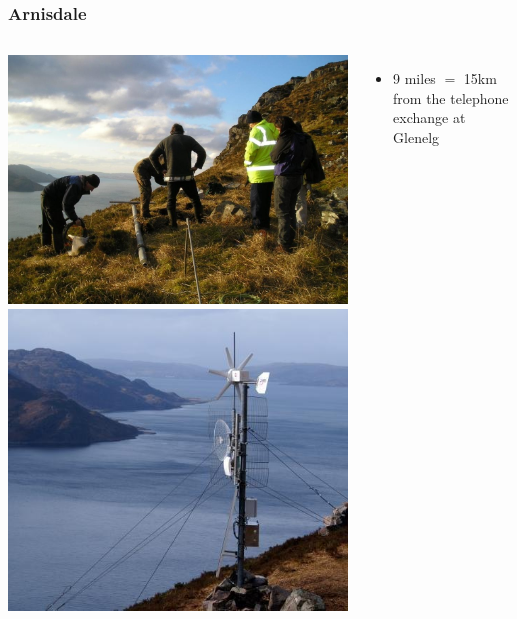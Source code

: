 \documentclass{beamer}
\begin{document}
\begin{frame}
  \frametitle{Arnisdale}
  \begin{columns}
    \begin{center}
      \vspace{-2\baselineskip}
      \includegraphics[width=1.2\textwidth]{starting.jpg}\\
      \includegraphics[width=1.2\textwidth]{stick.jpg}
    \end{center}
    \begin{itemize}%
      \item 9 miles $=$ 15km from the telephone exchange at Glenelg

\end{itemize}
\end{columns}
\end{frame}
\end{document}
